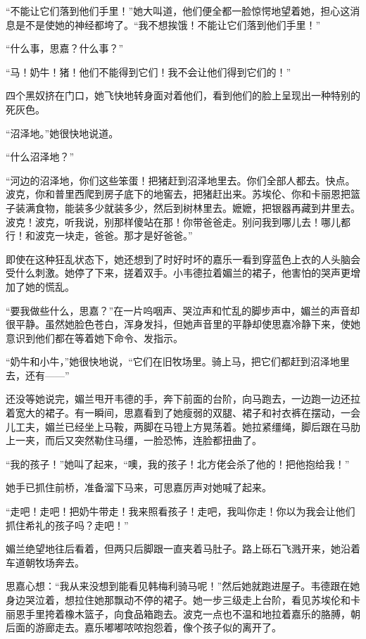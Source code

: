 \par “不能让它们落到他们手里！”她大叫道，他们便全都一脸惊愕地望着她，担心这消息是不是使她的神经都垮了。“我不想挨饿！不能让它们落到他们手里！”
\par “什么事，思嘉？什么事？”
\par “马！奶牛！猪！他们不能得到它们！我不会让他们得到它们的！”
\par 四个黑奴挤在门口，她飞快地转身面对着他们，看到他们的脸上呈现出一种特别的死灰色。
\par “沼泽地。”她很快地说道。
\par “什么沼泽地？”
\par “河边的沼泽地，你们这些笨蛋！把猪赶到沼泽地里去。你们全部人都去。快点。波克，你和普里西爬到房子底下的地窖去，把猪赶出来。苏埃伦、你和卡丽恩把篮子装满食物，能装多少就装多少，然后到树林里去。嬷嬷，把银器再藏到井里去。波克！波克，听我说，别那样傻站在那！你带爸爸走。别问我到哪儿去！哪儿都行！和波克一块走，爸爸。那才是好爸爸。”
\par 即使在这种狂乱状态下，她还想到了时好时坏的嘉乐一看到穿蓝色上衣的人头脑会受什么刺激。她停了下来，搓着双手。小韦德拉着媚兰的裙子，他害怕的哭声更增加了她的慌乱。
\par “要我做些什么，思嘉？”在一片呜咽声、哭泣声和忙乱的脚步声中，媚兰的声音却很平静。虽然她脸色苍白，浑身发抖，但她声音里的平静却使思嘉冷静下来，使她意识到他们都在等着她下命令、发指示。
\par “奶牛和小牛，”她很快地说，“它们在旧牧场里。骑上马，把它们都赶到沼泽地里去，还有——”
\par 还没等她说完，媚兰甩开韦德的手，奔下前面的台阶，向马跑去，一边跑一边还拉着宽大的裙子。有一瞬间，思嘉看到了她瘦弱的双腿、裙子和衬衣裤在摆动，一会儿工夫，媚兰已经坐上马鞍，两脚在马镫上方晃荡着。她拉紧缰绳，脚后跟在马肋上一夹，而后又突然勒住马缰，一脸恐怖，连脸都扭曲了。
\par “我的孩子！”她叫了起来，“噢，我的孩子！北方佬会杀了他的！把他抱给我！”
\par 她手已抓住前桥，准备溜下马来，可思嘉厉声对她喊了起来。
\par “走吧！走吧！把奶牛带走！我来照看孩子！走吧，我叫你走！你以为我会让他们抓住希礼的孩子吗？走吧！”
\par 媚兰绝望地往后看着，但两只后脚跟一直夹着马肚子。路上砾石飞溅开来，她沿着车道朝牧场奔去。
\par 思嘉心想：“我从来没想到能看见韩梅利骑马呢！”然后她就跑进屋子。韦德跟在她身边哭泣着，想拉住她那飘动不停的裙子。她一步三级走上台阶，看见苏埃伦和卡丽恩手里挎着橡木篮子，向食品箱跑去。波克一点也不温和地拉着嘉乐的胳膊，朝后面的游廊走去。嘉乐嘟嘟哝哝抱怨着，像个孩子似的离开了。
